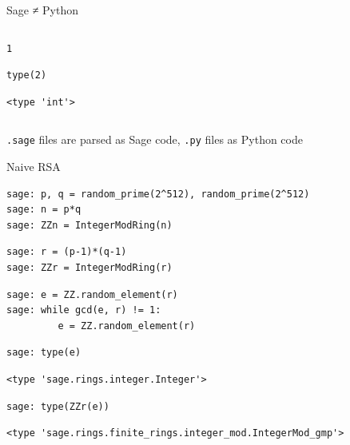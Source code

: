 \documentclass[presentation,smaller]{beamer}
\begin{document}
\begin{frame}[fragile,label={sec:orgb6e8ed0}]{Sage ≠ Python}
\begin{columns}[t]
\begin{column}{0.45\columnwidth}
\begin{verbatim}
1
\end{verbatim}

\lstset{language=Python,label= ,caption= ,captionpos=b,numbers=none}
\begin{lstlisting}
type(2)
\end{lstlisting}

\begin{verbatim}
<type 'int'>
\end{verbatim}
\end{column}
\end{columns}

\texttt{.sage} files are parsed as Sage code, \texttt{.py} files as Python code
\end{frame}

\begin{frame}{Naive RSA}
 \lstset{language=sage,label= ,caption= ,captionpos=b,numbers=none}
\begin{lstlisting}
sage: p, q = random_prime(2^512), random_prime(2^512)
sage: n = p*q
sage: ZZn = IntegerModRing(n)
\end{lstlisting}

\lstset{language=sage,label= ,caption= ,captionpos=b,numbers=none}
\begin{lstlisting}
sage: r = (p-1)*(q-1)
sage: ZZr = IntegerModRing(r)
\end{lstlisting}

\lstset{language=sage,label= ,caption= ,captionpos=b,numbers=none}
\begin{lstlisting}
sage: e = ZZ.random_element(r)
sage: while gcd(e, r) != 1:
         e = ZZ.random_element(r)
\end{lstlisting}

\framebreak{}

\lstset{language=sage,label= ,caption= ,captionpos=b,numbers=none}
\begin{lstlisting}
sage: type(e)
\end{lstlisting}

\begin{verbatim}
<type 'sage.rings.integer.Integer'>
\end{verbatim}

\lstset{language=sage,label= ,caption= ,captionpos=b,numbers=none}
\begin{lstlisting}
sage: type(ZZr(e))
\end{lstlisting}

\begin{verbatim}
<type 'sage.rings.finite_rings.integer_mod.IntegerMod_gmp'>
\end{verbatim}


\end{frame}
\end{document}
